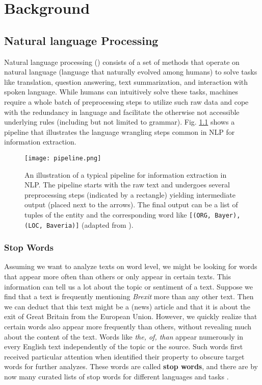 \chapter{Background}

\section{Natural language Processing}
  Natural language processing () consists of a set of methods that operate on natural language (language that naturally evolved among humans) to solve tasks like translation, question answering, text summarization, and interaction with spoken language.
  While humans can intuitively solve these tasks, machines require a whole batch of preprocessing steps to utilize such raw data and cope with the redundancy in language and facilitate the otherwise not accessible underlying rules (including but not limited to grammar).
  Fig. \ref{fig:pipeline} shows a pipeline that illustrates the language wrangling steps common in NLP for information extraction.

\begin{figure}[h!]
  \centering
  \texttt{[image: pipeline.png]}
  \caption{An illustration of a typical pipeline for information extraction in NLP. The pipeline starts with the raw text and undergoes several preprocessing steps (indicated by a rectangle) yielding intermediate output (placed next to the arrows). The final output can be a list of tuples of the entity and the corresponding word like \texttt{[(ORG, \textquotesingle Bayer\textquotesingle), (LOC, \textquotesingle Baveria\textquotesingle)]} (adapted from \cite{Bird2009}).}
\label{fig:pipeline}
\end{figure}

\subsection{Stop Words}
  Assuming we want to analyze texts on word level, we might be looking for
  words that appear more often than others or only appear in certain texts.
  This information can tell us a lot about the topic or sentiment of a text.
  Suppose we find that a text is frequently mentioning \textit{Brexit} more than any other text.
  Then we can deduct that this text might be a (news) article and that it is about the exit of Great Britain from the European Union.
  However, we quickly realize that certain words also appear more frequently than others, without revealing much about the content of the text.
  Words like \textit{the, of, than} appear numerously in every English text independently of the topic or the source.
  Such words first received particular attention when \cite{Luhn1960} identified their property to obscure target words for further analyzes.
  These words are called \textbf{stop words}, and there are by now many curated lists of stop words for different languages and tasks \citep{RANKS2019}.

